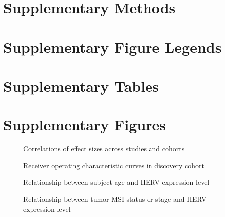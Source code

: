 \documentclass[11pt,letterpaper]{article}
\makeatletter
\renewcommand{\maketitle}{
        \begingroup
            \setlength{\parindent}{0pt}
            \begin{flushleft}
                \LARGE\textbf{\@title}
                \newline
                \newline
                \small\@author
            \end{flushleft}
        \endgroup
    }
\makeatother
\begin{document}
\maketitle

\newpage
\section*{Supplementary Methods}


\newpage



\newpage
\section*{Supplementary Figure Legends}


\newpage
\section*{Supplementary Tables}




\FloatBarrier
\newpage
\section*{Supplementary Figures}

\begin{figure}[ht]
  \caption{Correlations of effect sizes across studies and cohorts}
  \label{fig:corrs}
\end{figure}

\begin{figure}[ht]
  \caption{Receiver operating characteristic curves in discovery cohort}
  \label{fig:rocA}
\end{figure}

\begin{figure}[ht]
  \caption{Relationship between subject age and HERV expression level}
  \label{fig:age}
\end{figure}

\begin{figure}[ht]
  \caption{Relationship between tumor MSI status or stage and HERV expression level}
  \label{fig:msistage}
\end{figure}
\end{document}
